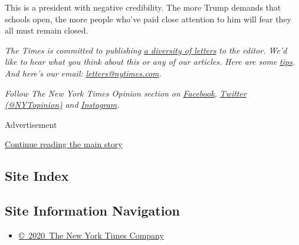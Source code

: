 This is a president with negative credibility. The more Trump demands
that schools open, the more people who've paid close attention to him
will fear they all must remain closed.

\emph{The Times is committed to publishing}
\href{https://www.nytimes.com/2019/01/31/opinion/letters/letters-to-editor-new-york-times-women.html}{\emph{a
diversity of letters}} \emph{to the editor. We'd like to hear what you
think about this or any of our articles. Here are some}
\href{https://help.nytimes.com/hc/en-us/articles/115014925288-How-to-submit-a-letter-to-the-editor}{\emph{tips}}\emph{.
And here's our email:}
\href{mailto:letters@nytimes.com}{\emph{letters@nytimes.com}}\emph{.}

\emph{Follow The New York Times Opinion section on}
\href{https://www.facebook.com/nytopinion}{\emph{Facebook}}\emph{,}
\href{http://twitter.com/NYTOpinion}{\emph{Twitter (@NYTopinion)}}
\emph{and}
\href{https://www.instagram.com/nytopinion/}{\emph{Instagram}}\emph{.}

Advertisement

\protect\hyperlink{after-bottom}{Continue reading the main story}

\hypertarget{site-index}{%
\subsection{Site Index}\label{site-index}}

\hypertarget{site-information-navigation}{%
\subsection{Site Information
Navigation}\label{site-information-navigation}}

\begin{itemize}
\tightlist
\item
  \href{https://help.nytimes.com/hc/en-us/articles/115014792127-Copyright-notice}{©~2020~The
  New York Times Company}
\end{itemize}

